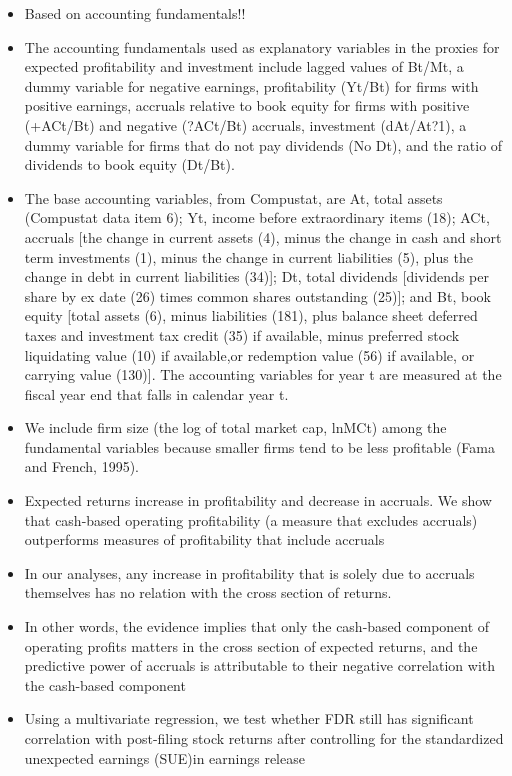 \documentclass[12pt]{article}
\begin{document}
    \begin{itemize}

        \item Based on accounting fundamentals!! 

        \item The accounting fundamentals used as explanatory variables in the proxies for expected profitability and investment include lagged values of Bt/Mt, a dummy variable for negative earnings, profitability (Yt/Bt) for firms with positive earnings, accruals relative to book
        equity for firms with positive (+ACt/Bt) and negative (?ACt/Bt) accruals, investment (dAt/At?1), a dummy variable for firms that do not pay dividends (No Dt), and the ratio of dividends to book equity (Dt/Bt).\citep{Fama2006}

        \item The base accounting variables, from Compustat, are At, total assets (Compustat data item 6); Yt, income before extraordinary items (18); ACt, accruals [the change in current assets (4), minus the change in cash and short term investments (1), minus the change in current liabilities (5), plus the change in debt in current liabilities (34)]; Dt, total dividends [dividends per share by ex date (26) times common shares outstanding (25)]; and Bt, book equity  [total assets (6), minus liabilities (181), plus balance sheet deferred taxes and investment tax credit (35) if available, minus preferred stock liquidating value (10) if available,or redemption value (56) if available, or carrying value (130)]. The accounting variables for year t are measured at the fiscal year end that falls in calendar year t. \citep{Fama2006}

        \item We include firm size (the log of total market cap, lnMCt) among the fundamental variables because smaller firms tend to be less profitable (Fama and French, 1995).\citep{Fama2006}

        \item Expected returns increase in profitability and decrease in accruals. We show that cash-based operating profitability (a measure that excludes accruals) outperforms measures of profitability that include accruals \citep{Ball2016}

        \item In our analyses, any increase in profitability that is solely due to accruals themselves has no relation with the cross section of returns.\citep{Ball2016}

        \item In other words, the evidence implies that only the cash-based component of operating profits matters in the cross section of expected returns, and the predictive power of accruals is attributable to their negative correlation with the cash-based component \citep{Ball2016}
       
        \item Using a multivariate regression, we test whether FDR still has significant correlation with post-filing stock returns after controlling for the standardized unexpected earnings (SUE)in earnings release \citep{You2009}

    \end{itemize}
\end{document}
